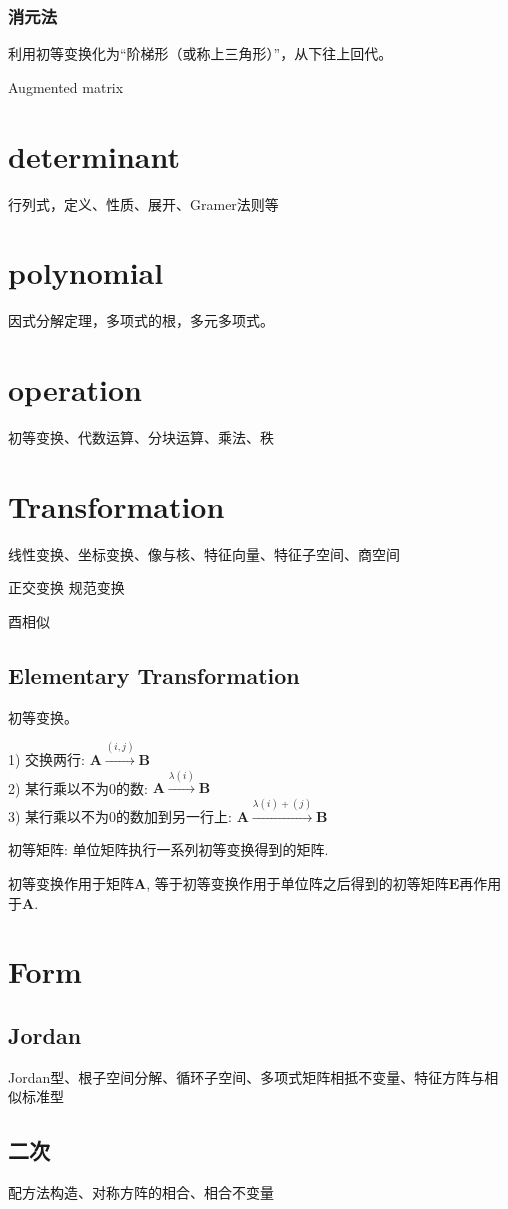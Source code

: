 \documentclass[UTF8]{../../09-Mathematics}
\begin{document}
\subsubsection{消元法}
利用初等变换化为“阶梯形（或称上三角形）”，从下往上回代。


Augmented matrix

\section{determinant}
行列式，定义、性质、展开、Gramer法则等

\section{polynomial}
因式分解定理，多项式的根，多元多项式。


\section{operation}
初等变换、代数运算、分块运算、乘法、秩

\section{Transformation}

线性变换、坐标变换、像与核、特征向量、特征子空间、商空间

正交变换
规范变换

酉相似

\subsection{Elementary Transformation}
初等变换。

1) 交换两行: $ \boldsymbol A \xrightarrow {(i,j)} \boldsymbol B$ \\

2) 某行乘以不为0的数: $ \boldsymbol A \xrightarrow {\lambda(i)} \boldsymbol B$ \\

3) 某行乘以不为0的数加到另一行上: $ \boldsymbol A \xrightarrow {\lambda(i) + (j)} \boldsymbol B$

初等矩阵: 单位矩阵执行一系列初等变换得到的矩阵. 

初等变换作用于矩阵$\boldsymbol A$, 等于初等变换作用于单位阵之后得到的初等矩阵$\boldsymbol E$再作用于$\boldsymbol A$. 



\section{Form}

\subsection{Jordan}

Jordan型、根子空间分解、循环子空间、多项式矩阵相抵不变量、特征方阵与相似标准型

\subsection{二次}
配方法构造、对称方阵的相合、相合不变量
\end{document}
